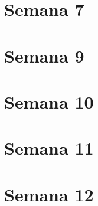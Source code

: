 \documentclass[12pt]{report} %
\begin{document}
\part{Semana 7}


\part{Semana 9}


\part{Semana 10}


\part{Semana 11}


\part{Semana 12}

\end{document}

